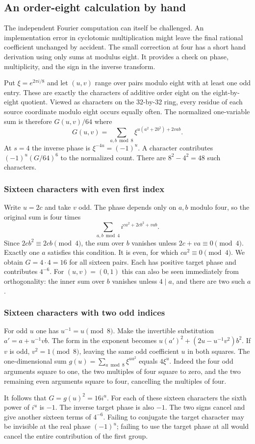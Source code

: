 \documentclass[12pt,letterpaper]{article}
\begin{document}
\subsection{An order-eight calculation by hand}
The independent Fourier computation can itself be challenged. An implementation error in cyclotomic multiplication might leave the final rational coefficient unchanged by accident. The small correction at four has a short hand derivation using only sums at modulus eight. It provides a check on phase, multiplicity, and the sign in the inverse transform.
\par
Put $\xi=e^{2\pi i/8}$ and let $(u,v)$ range over pairs modulo eight with at least one odd entry. These are exactly the characters of additive order eight on the eight-by-eight quotient. Viewed as characters on the 32-by-32 ring, every residue of each source coordinate modulo eight occurs equally often. The normalized one-variable sum is therefore $G(u,v)/64$ where
\[
 G(u,v)=\sum_{a,b\bmod8}\xi^{u(a^2+2b^2)+2vab}.
\]
At $s=4$ the inverse phase is $\xi^{-4u}=(-1)^u$. A character contributes $(-1)^u(G/64)^6$ to the normalized count. There are $8^2-4^2=48$ such characters.
\subsubsection{Sixteen characters with even first index}
Write $u=2c$ and take $v$ odd. The phase depends only on $a,b$ modulo four, so the original sum is four times
\[
    \sum_{a,b\bmod4} i^{c a^2+2c b^2+vab}.
\]
Since $2c b^2\equiv2c b\pmod4$, the sum over $b$ vanishes unless $2c+va\equiv0\pmod4$. Exactly one $a$ satisfies this condition. It is even, for which $ca^2\equiv0\pmod4$. We obtain $G=4\cdot4=16$ for all sixteen pairs. Each has positive target phase and contributes $4^{-6}$. For $(u,v)=(0,1)$ this can also be seen immediately from orthogonality: the inner sum over $b$ vanishes unless $4\mid a$, and there are two such $a$.
\subsubsection{Sixteen characters with two odd indices}
For odd $u$ one has $u^{-1}=u\pmod8$. Make the invertible substitution $a'=a+u^{-1}vb$. The form in the exponent becomes $u(a')^2+(2u-u^{-1}v^2)b^2$. If $v$ is odd, $v^2=1\pmod8$, leaving the same odd coefficient $u$ in both squares. The one-dimensional sum $g(u)=\sum_{a\bmod8}\xi^{ua^2}$ equals $4\xi^u$. Indeed the four odd arguments square to one, the two multiples of four square to zero, and the two remaining even arguments square to four, cancelling the multiples of four.
\par
It follows that $G=g(u)^2=16 i^u$. For each of these sixteen characters the sixth power of $i^u$ is $-1$. The inverse target phase is also $-1$. The two signs cancel and give another sixteen terms of $4^{-6}$. Failing to conjugate the target character may be invisible at the real phase $(-1)^u$; failing to use the target phase at all would cancel the entire contribution of the first group.
\end{document}
